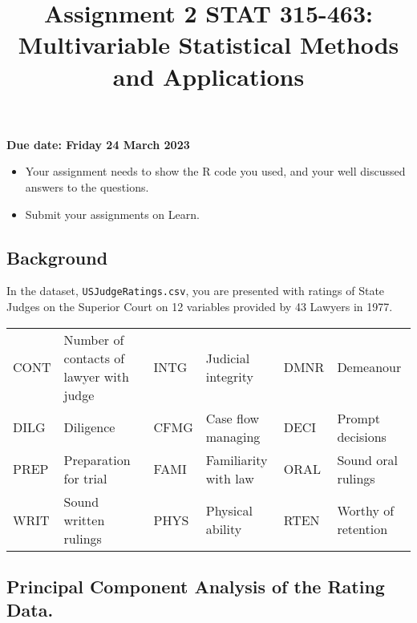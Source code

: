 \documentclass[
]{article}
\title{Assignment 2 STAT 315-463: Multivariable Statistical Methods and
Applications}
\author{}
\date{\vspace{-2.5em}}
\providecommand{\tightlist}{%
  \setlength{\itemsep}{0pt}\setlength{\parskip}{0pt}}
\begin{document}
\maketitle

\vspace{-8 mm}

\textbf{Due date: Friday 24 March 2023}\\
\vspace{-7 mm}

\begin{itemize}
\tightlist
\item
  Your assignment needs to show the R code you used, and your well
  discussed answers to the questions.
\item
  Submit your assignments on Learn. \vspace{- 2 mm}
\end{itemize}

\hypertarget{background}{%
\subsection{Background}\label{background}}

In the dataset, \texttt{USJudgeRatings.csv}, you are presented with
ratings of State Judges on the Superior Court on 12 variables provided
by 43 Lawyers in 1977.\vspace{-5 mm}

\begin{center}
\begin{tabular}{l|l||l|l||l|l} \hline
CONT &  Number of contacts of lawyer with judge &
INTG &  Judicial integrity &
DMNR &  Demeanour \\
DILG &  Diligence &
CFMG &  Case flow managing &
DECI &  Prompt decisions \\
PREP &  Preparation for trial &
FAMI &  Familiarity with law &
ORAL &  Sound oral rulings \\
WRIT &  Sound written rulings &
PHYS &  Physical ability &
RTEN &  Worthy of retention \\ \hline
\end{tabular}\end{center}

\hypertarget{principal-component-analysis-of-the-rating-data.}{%
\subsection{Principal Component Analysis of the Rating
Data.}\label{principal-component-analysis-of-the-rating-data.}}
\end{document}
